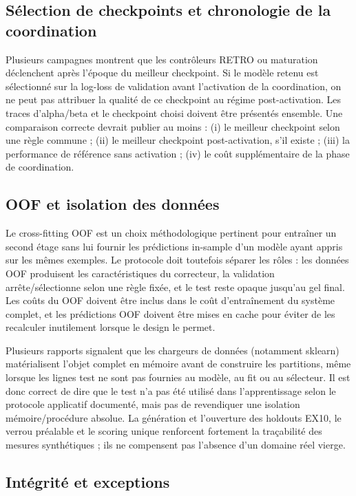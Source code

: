 \documentclass[11pt,a4paper]{article}
\begin{document}
\subsection{Sélection de checkpoints et chronologie de la coordination}

Plusieurs campagnes montrent que les contrôleurs RETRO ou maturation déclenchent après l'époque du meilleur checkpoint. Si le modèle retenu est sélectionné sur la log-loss de validation avant l'activation de la coordination, on ne peut pas attribuer la qualité de ce checkpoint au régime post-activation. Les traces d'alpha/beta et le checkpoint choisi doivent être présentés ensemble. Une comparaison correcte devrait publier au moins : (i) le meilleur checkpoint selon une règle commune ; (ii) le meilleur checkpoint post-activation, s'il existe ; (iii) la performance de référence sans activation ; (iv) le coût supplémentaire de la phase de coordination.

\subsection{OOF et isolation des données}

Le cross-fitting OOF est un choix méthodologique pertinent pour entraîner un second étage sans lui fournir les prédictions in-sample d'un modèle ayant appris sur les mêmes exemples. Le protocole doit toutefois séparer les rôles : les données OOF produisent les caractéristiques du correcteur, la validation arrête/sélectionne selon une règle fixée, et le test reste opaque jusqu'au gel final. Les coûts du OOF doivent être inclus dans le coût d'entraînement du système complet, et les prédictions OOF doivent être mises en cache pour éviter de les recalculer inutilement lorsque le design le permet.

Plusieurs rapports signalent que les chargeurs de données (notamment sklearn) matérialisent l'objet complet en mémoire avant de construire les partitions, même lorsque les lignes test ne sont pas fournies au modèle, au fit ou au sélecteur. Il est donc correct de dire que le test n'a pas été utilisé dans l'apprentissage selon le protocole applicatif documenté, mais pas de revendiquer une isolation mémoire/procédure absolue. La génération et l'ouverture des holdouts EX10, le verrou préalable et le scoring unique renforcent fortement la traçabilité des mesures synthétiques ; ils ne compensent pas l'absence d'un domaine réel vierge.

\subsection{Intégrité et exceptions}
\end{document}
